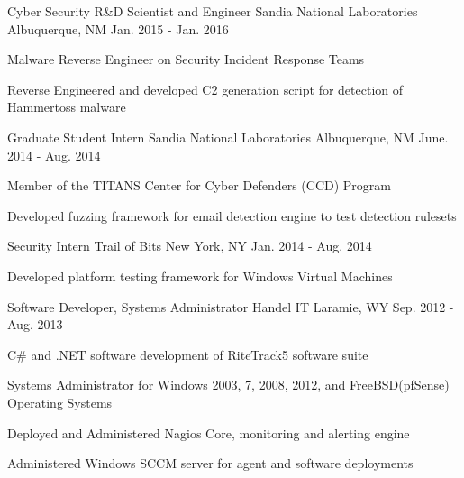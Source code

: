 \begin{cventries}

\cventry
{Cyber Security R\&D Scientist and Engineer} %
{Sandia National Laboratories} %
{Albuquerque, NM} %
{Jan. 2015 - Jan. 2016} %
{ %
\begin{cvitems}
\item {Malware Reverse Engineer on Security Incident Response Teams}
\item {Reverse Engineered and developed C2 generation script for detection of Hammertoss malware}
\end{cvitems}
}


\cventry
{Graduate Student Intern} %
{Sandia National Laboratories} %
{Albuquerque, NM} %
{June. 2014 - Aug. 2014} %
{ %
\begin{cvitems}
\item {Member of the TITANS Center for Cyber Defenders (CCD) Program}
\item {Developed fuzzing framework for email detection engine to test detection rulesets}
\end{cvitems}
}


\cventry
{Security Intern} %
{Trail of Bits} %
{New York, NY} %
{Jan. 2014 - Aug. 2014} %
{ %
\begin{cvitems}
\item {Developed platform testing framework for Windows Virtual Machines}
\end{cvitems}
}


\cventry
{Software Developer, Systems Administrator} %
{Handel IT} %
{Laramie, WY} %
{Sep. 2012 - Aug. 2013} %
{ %
\begin{cvitems}
\item {C\# and .NET software development of RiteTrack5 software suite}
\item {Systems Administrator for Windows 2003, 7, 2008, 2012, and FreeBSD(pfSense) Operating Systems}
\item {Deployed and Administered Nagios Core, monitoring and alerting engine}
\item {Administered Windows SCCM server for agent and software deployments}
\end{cvitems} 
}


\end{cventries}
